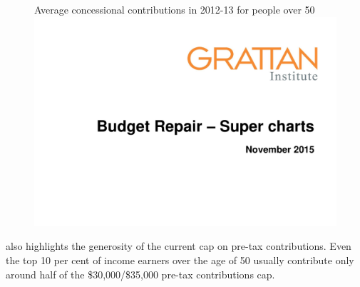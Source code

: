 \begin{figure}
%
{Average concessional contributions in 2012-13 for people over 50}\label{fig:SUPER-4-4}
\includegraphics[width=\columnwidth,page=22]{super-atlas/PPTX.pdf}
\end{figure}

 also highlights the generosity of the current cap on pre-tax contributions. Even the top 10 per cent of income earners over the age of 50 usually contribute only around half of the \$30,000/\$35,000 pre-tax contributions cap. 

